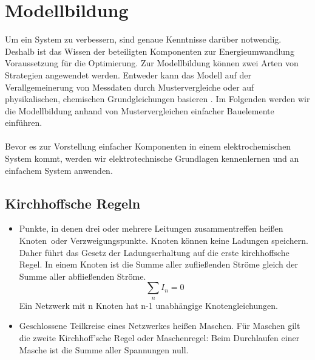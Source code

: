 \chapter{Modellbildung}\label{mod}
Um ein System zu verbessern, sind genaue Kenntnisse darüber notwendig. Deshalb ist das Wissen der beteiligten Komponenten zur Energieumwandlung Voraussetzung für die Optimierung. Zur Modellbildung können zwei Arten von Strategien angewendet werden. Entweder kann das Modell auf der Verallgemeinerung von Messdaten durch Mustervergleiche oder auf physikalischen, chemischen Grundgleichungen basieren \cite{Mauracher1996}. Im Folgenden werden wir die Modellbildung anhand von Mustervergleichen einfacher Bauelemente einführen. \\\\

Bevor es zur Vorstellung einfacher Komponenten in einem elektrochemischen System kommt, werden wir elektrotechnische Grundlagen kennenlernen und an einfachem System anwenden. 

\section{Kirchhoffsche Regeln}\label{mod:kirch}
\begin{itemize}
\item Punkte, in denen drei oder mehrere Leitungen zusammentreffen heißen \glqq Knoten\grqq\ oder \glqq Verzweigungspunkte\grqq. Knoten können keine Ladungen speichern. Daher führt das Gesetz der Ladungserhaltung auf die erste kirchhoffsche Regel. In einem Knoten ist die Summe aller zufließenden Ströme gleich der Summe aller abfließenden Ströme.
	  \[
		\sum_n I_n = 0
	  \]
	  Ein Netzwerk mit n Knoten hat n-1 unabhängige Knotengleichungen.
\item Geschlossene Teilkreise eines Netzwerkes heißen \glqq Maschen\grqq. Für Maschen gilt die zweite 				Kirchhoff'sche Regel oder Maschenregel: Beim Durchlaufen einer Masche ist die Summe aller Spannungen null.
\end{itemize}
\cite[S.63]{Kuypers2012B2}
